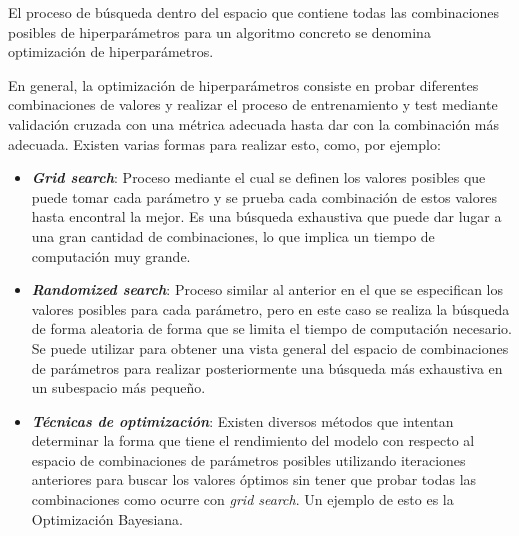 El proceso de búsqueda dentro del espacio que contiene todas las combinaciones
posibles de hiperparámetros para un algoritmo concreto se denomina optimización
de hiperparámetros.

En general, la optimización de hiperparámetros consiste en probar diferentes
combinaciones de valores y realizar el proceso de entrenamiento y test mediante
validación cruzada con una métrica adecuada hasta dar con la combinación más
adecuada. Existen varias formas para realizar esto, como, por ejemplo:

\begin{itemize}
    \item \textbf{\textit{Grid search}}: Proceso mediante el cual se definen los
    valores posibles que puede tomar cada parámetro y se prueba cada combinación
    de estos valores hasta encontral la mejor. Es una búsqueda exhaustiva que
    puede dar lugar a una gran cantidad de combinaciones, lo que implica un
    tiempo de computación muy grande.
    \item \textbf{\textit{Randomized search}}: Proceso similar al anterior en el
    que se especifican los valores posibles para cada parámetro, pero en este
    caso se realiza la búsqueda de forma aleatoria de forma que se limita el
    tiempo de computación necesario. Se puede utilizar para obtener una vista
    general del espacio de combinaciones de parámetros para realizar
    posteriormente una búsqueda más exhaustiva en un subespacio más pequeño.
    \item \textbf{\textit{Técnicas de optimización}}: Existen diversos métodos
    que intentan determinar la forma que tiene el rendimiento del modelo con
    respecto al espacio de combinaciones de parámetros posibles utilizando
    iteraciones anteriores para buscar los valores óptimos sin tener que probar
    todas las combinaciones como ocurre con \textit{grid search}. Un ejemplo de
    esto es la Optimización Bayesiana.
\end{itemize}
